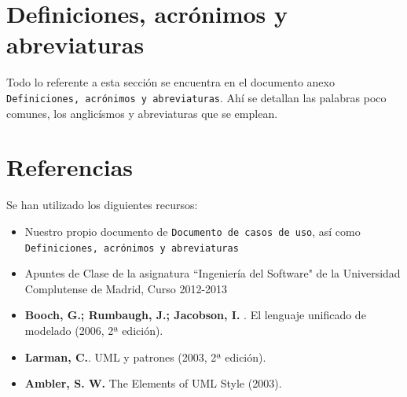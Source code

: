 \documentclass[spanish,a4paper,11pt, twoside]{report}	%
\begin{document}
\section{Definiciones, acrónimos y abreviaturas}

	Todo lo referente a esta sección se encuentra en el documento anexo \texttt{Definiciones, acrónimos y abreviaturas}. Ahí se detallan las palabras poco comunes, los anglicísmos y abreviaturas que se emplean.

	\section{Referencias}
	Se han utilizado los diguientes recursos:
	\begin{itemize}
		\item Nuestro propio documento de \texttt{Documento de casos de uso}, así como \\ \texttt{Definiciones, acrónimos y abreviaturas}
		\item Apuntes de Clase de la asignatura “Ingeniería del Software" de la Universidad Complutense de Madrid, Curso 2012-2013
		\item \textbf{Booch, G.; Rumbaugh, J.; Jacobson, I. }. El lenguaje unificado de modelado (2006, 2ª edición).
		\item \textbf{Larman, C.}. UML y patrones (2003, 2ª edición).
		\item \textbf{Ambler, S. W.} The Elements of UML Style (2003).
	\end{itemize}

\newpage
\mbox{}
\thispagestyle{empty}						%
\newpage





\setcounter{section}{0}
\end{document}
